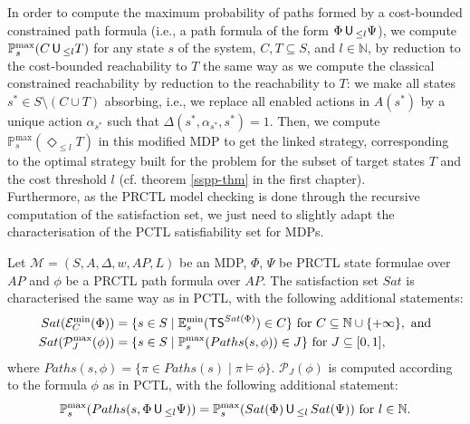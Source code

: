 In order to compute the maximum probability of paths formed by a cost-bounded constrained path formula (i.e., a path formula of the form $\Phi \,\text{\sffamily U}\,_{\leq l} \Psi$),
we compute $\mathbb{P}_s^{\max}(C \,\text{\sffamily U}\,_{\leq l} T)$ for any state $s$ of the system, $C, T \subseteq S$, and $l \in \mathbb{N}$, by reduction to the cost-bounded reachability to $T$ the same way as we compute the classical constrained reachability by reduction to the reachability to $T$:
we make all states $s^* \in S \setminus (C \cup T)$ absorbing, i.e., we replace all enabled actions in $A(s^*)$
by a unique action $\alpha_{s^*}$ such that $\Delta(s^*, \alpha_{s^*}, s^*) = 1$.
Then, we compute $\mathbb{P}^{\max}_s(\Diamond_{\leq l} T)$ in this modified MDP to get the linked strategy, corresponding to the optimal strategy built for the \SSPP{} problem for the subset of target states $T$ and the cost threshold $l$ (cf. theorem \ref{sspp-thm} in the first chapter). \\

Furthermore, as the PRCTL model checking is done
through the recursive computation of the satisfaction set, we just need to slightly adapt the characterisation of the PCTL satisfiability set for MDPs.
\begin{property}
  Let $\mathcal{M}=(S,A, \Delta, w, AP, L)$ be an MDP, $\Phi$, $\Psi$ be PRCTL state formulae over $AP$ and $\phi$ be a PRCTL path formula over $AP$. The satisfaction set $Sat$ is characterised the same way as in PCTL, with the following additional statements:
  \begin{align*}
    Sat(\mathcal{E}^{\min}_C(\Phi)) &= \{ s \in S \; | \; \mathbb{E}^{\min}_s(\text{\sffamily TS}^{Sat(\Phi)}) \in C \} \text{ for } C \subseteq \mathbb{N} \cup \{+\infty\}, \text{ and} \\
    Sat(\mathcal{P}^{\max}_J(\phi)) &= \{ s \in S \; | \; \mathbb{P}^{\max}_s (Paths(s, \phi)) \in J \} \text{ for } J \subseteq [0, 1],
  \end{align*}
    where $Paths(s, \phi) = \{ \pi \in Paths(s) \; | \; \pi \models \phi \}$.
    $\mathcal{P}_J(\phi)$ is computed according to the formula $\phi$ as in PCTL, with the following additional statement:
  \[
    \mathbb{P}^{\max}_s(Paths(s, \Phi \,\text{\sffamily U}\,_{\leq l} \Psi)) = \mathbb{P}^{\max}_s(Sat(\Phi) \,\text{\sffamily U}\,_{\leq l} \, Sat(\Psi)) \text{ for } l \in \mathbb{N}.
  \]
\end{property}

